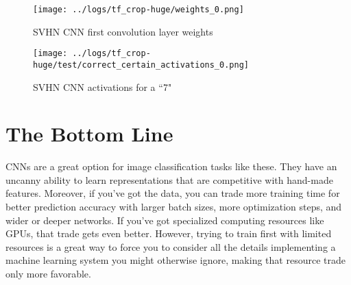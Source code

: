 \documentclass{article}
\begin{document}
\begin{figure}[htbp]
  \centering
  \texttt{[image: ../logs/tf\_crop-huge/weights\_0.png]}
  \caption{SVHN CNN first convolution layer weights}
  \label{fig:svhn_cnn_weights}
\end{figure}

\begin{figure}[htbp]
  \centering
  \texttt{[image: ../logs/tf\_crop-huge/test/correct\_certain\_activations\_0.png]}
  \caption{SVHN CNN activations for a ``7"}
  \label{fig:svhn_cnn_activations}
\end{figure}

\section{The Bottom Line}

CNNs are a great option for image classification tasks like these. They have an uncanny ability to learn representations that are competitive with hand-made features. Moreover, if you've got the data, you can trade more training time for better prediction accuracy with larger batch sizes, more optimization steps, and wider or deeper networks. If you've got specialized computing resources like GPUs, that trade gets even better. However, trying to train first with limited resources is a great way to force you to consider all the details implementing a machine learning system you might otherwise ignore, making that resource trade only more favorable.

\printbibliography[heading=bibintoc,title={References}]
\end{document}
